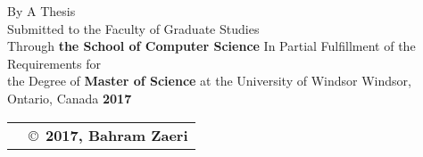 \pagebreak
{
\centering
\thesistitle
\tpbreak
By
\tpbreak
\nameanddegrees
\tpbreak
A Thesis \\
Submitted to the Faculty of Graduate Studies \\
Through \textbf{the School of Computer Science}
\tpbreak
In Partial Fulfillment of the Requirements for \\
the Degree of \textbf{Master of Science} 
\tpbreak at the University of Windsor
\tpbreak Windsor, Ontario, Canada
\tpbreak \textbf{2017}
\vfill
\begin{tabular}{cl}
& \copyright\ \textbf{2017, Bahram Zaeri}\\
\end{tabular}
\tpbreak
\hfill
}
\pagebreak
